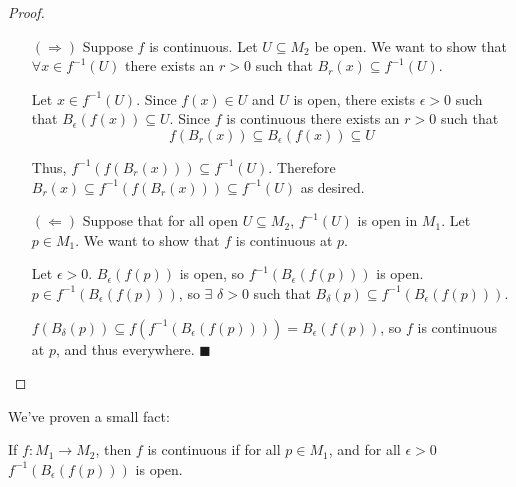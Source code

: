 \begin{proof}
\begin{itemize}
\item[$(\Rightarrow)$] Suppose $f$ is continuous. Let $U \subseteq M_2$ be open.  We want to show that $\forall x \in f^{-1} (U)$ there exists an $r>0$ such that $B_r (x) \subseteq f^{-1} (U)$.

Let $x\in f^{-1} (U)$.  Since $f(x)\in U$ and $U$ is open, there exists $\epsilon >0$ such that $B_\epsilon (f(x)) \subseteq U$.  Since $f$ is continuous there exists an $r>0$ such that 
\[f(B_r (x)) \subseteq B_\epsilon (f(x)) \subseteq U\]

Thus, $f^{-1} (f(B_r (x))) \subseteq f^{-1} (U)$.  Therefore $B_r (x) \subseteq f^{-1} (f(B_r (x))) \subseteq f^{-1} (U)$ as desired.

\item[$(\Leftarrow)$] Suppose that for all open $U\subseteq M_{2}$, $f^{-1}(U)$ is open in $M_{1}$.  Let $p \in M_{1}$.  We want to show that $f$ is continuous at $p$.

Let $\epsilon > 0$.  $B_{\epsilon}(f(p))$ is open, so $f^{-1}(B_{\epsilon}(f(p)))$ is open.  $p\in f^{-1}(B_{\epsilon}(f(p)))$, so $\exists$ $\delta>0$ such that $B_{\delta}(p)\subseteq f^{-1}(B_{\epsilon}(f(p)))$.

 $f(B_{\delta}(p))\subseteq f(f^{-1}(B_{\epsilon}(f(p))))=B_{\epsilon}(f(p))$, so $f$ is continuous at $p$, and thus everywhere.  $\blacksquare$
 \end{itemize}
 \end{proof}
 
 We've proven a small fact:
\begin{smallfact}  If $f : M_{1} \rightarrow M_{2}$, then $f$ is continuous if for all $p\in M_{1}$, and for all $\epsilon>0$ $f^{-1}(B_{\epsilon}(f(p)))$ is open.
\end{smallfact}
 
